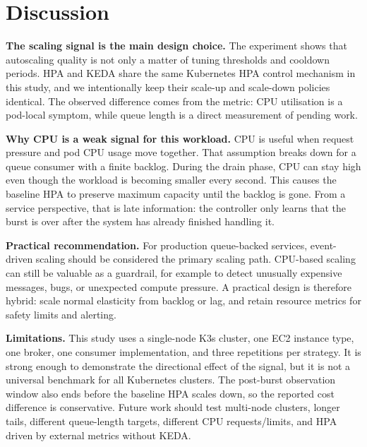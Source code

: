\section{Discussion}
\label{sec:discussion}

\textbf{The scaling signal is the main design choice.} The experiment shows that autoscaling quality is not only a matter of tuning thresholds and cooldown periods. HPA and KEDA share the same Kubernetes HPA control mechanism in this study, and we intentionally keep their scale-up and scale-down policies identical. The observed difference comes from the metric: CPU utilisation is a pod-local symptom, while queue length is a direct measurement of pending work.

\textbf{Why CPU is a weak signal for this workload.} CPU is useful when request pressure and pod CPU usage move together. That assumption breaks down for a queue consumer with a finite backlog. During the drain phase, CPU can stay high even though the workload is becoming smaller every second. This causes the baseline HPA to preserve maximum capacity until the backlog is gone. From a service perspective, that is late information: the controller only learns that the burst is over after the system has already finished handling it.

\textbf{Practical recommendation.} For production queue-backed services, event-driven scaling should be considered the primary scaling path. CPU-based scaling can still be valuable as a guardrail, for example to detect unusually expensive messages, bugs, or unexpected compute pressure. A practical design is therefore hybrid: scale normal elasticity from backlog or lag, and retain resource metrics for safety limits and alerting.

\textbf{Limitations.} This study uses a single-node K3s cluster, one EC2 instance type, one broker, one consumer implementation, and three repetitions per strategy. It is strong enough to demonstrate the directional effect of the signal, but it is not a universal benchmark for all Kubernetes clusters. The post-burst observation window also ends before the baseline HPA scales down, so the reported cost difference is conservative. Future work should test multi-node clusters, longer tails, different queue-length targets, different CPU requests/limits, and HPA driven by external metrics without KEDA.
